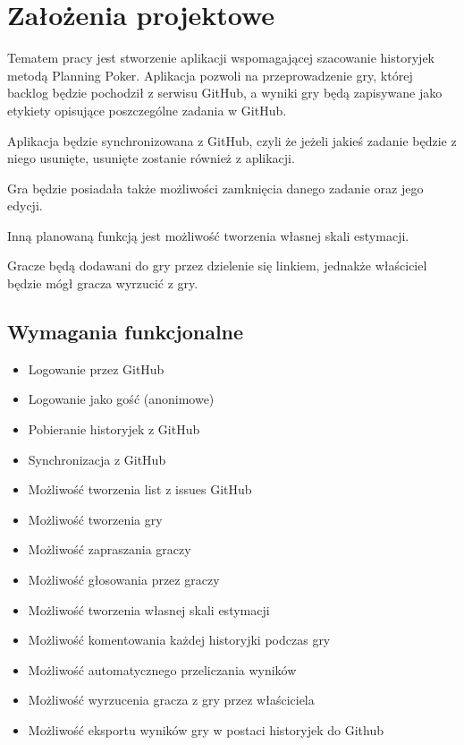 ﻿\chapter{Założenia projektowe}

Tematem pracy jest stworzenie aplikacji wspomagającej szacowanie historyjek metodą Planning Poker.
Aplikacja pozwoli na przeprowadzenie gry, której backlog będzie pochodził z serwisu GitHub,
a wyniki gry będą zapisywane jako etykiety opisujące poszczególne zadania w GitHub.

Aplikacja będzie synchronizowana z GitHub,
czyli że jeżeli jakieś zadanie będzie z niego usunięte, usunięte zostanie również
z aplikacji.

Gra będzie posiadała także możliwości zamknięcia danego zadanie oraz jego edycji.

Inną planowaną funkcją jest możliwość tworzenia własnej skali estymacji.

Gracze będą dodawani do gry przez dzielenie się linkiem,
jednakże właściciel będzie mógł gracza wyrzucić z gry.

\section{Wymagania funkcjonalne}

\begin{itemize}
    \item Logowanie przez GitHub
    \item Logowanie jako gość (anonimowe)
    \item Pobieranie historyjek z GitHub
    \item Synchronizacja z GitHub
    \item Możliwość tworzenia list z issues GitHub
    \item Możliwość tworzenia gry
    \item Możliwość zapraszania graczy
    \item Możliwość głosowania przez graczy
    \item Możliwość tworzenia własnej skali estymacji
    \item Możliwość komentowania każdej historyjki podczas gry
    \item Możliwość automatycznego przeliczania wyników
    \item Możliwość wyrzucenia gracza z gry przez właściciela
    \item Możliwość eksportu wyników gry w postaci historyjek do Github
\end{itemize}

